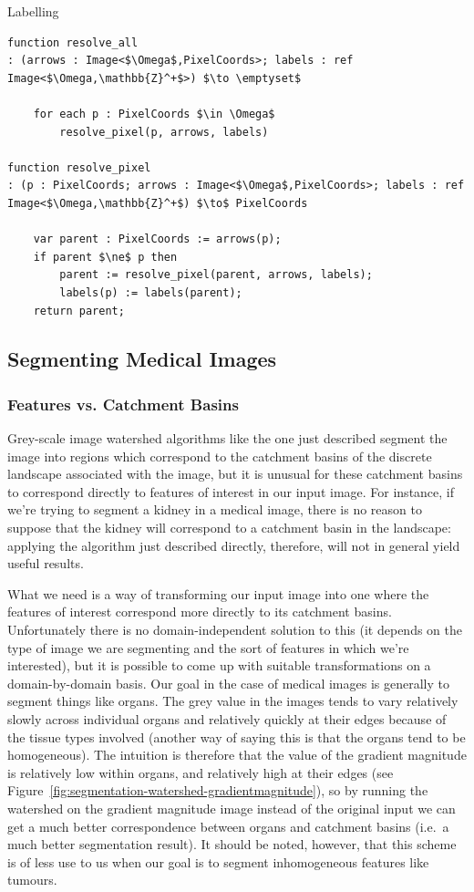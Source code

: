 \begin{stulisting}[p]
\caption{Labelling}
\label{code:segmentation-watershed-labelling}
\begin{lstlisting}[style=Default]
function resolve_all
: (arrows : Image<$\Omega$,PixelCoords>; labels : ref Image<$\Omega,\mathbb{Z}^+$>) $\to \emptyset$

	for each p : PixelCoords $\in \Omega$
		resolve_pixel(p, arrows, labels)

function resolve_pixel
: (p : PixelCoords; arrows : Image<$\Omega$,PixelCoords>; labels : ref Image<$\Omega,\mathbb{Z}^+$) $\to$ PixelCoords

	var parent : PixelCoords := arrows(p);
	if parent $\ne$ p then
		parent := resolve_pixel(parent, arrows, labels);
		labels(p) := labels(parent);
	return parent;
\end{lstlisting}
\end{stulisting}

\subsection{Segmenting Medical Images}

\subsubsection{Features vs. Catchment Basins}

Grey-scale image watershed algorithms like the one just described segment the image into regions which correspond to the catchment basins of the discrete landscape associated with the image, but it is unusual for these catchment basins to correspond directly to features of interest in our input image. For instance, if we're trying to segment a kidney in a medical image, there is no reason to suppose that the kidney will correspond to a catchment basin in the landscape: applying the algorithm just described directly, therefore, will not in general yield useful results.

What we need is a way of transforming our input image into one where the features of interest correspond more directly to its catchment basins. Unfortunately there is no domain-independent solution to this (it depends on the type of image we are segmenting and the sort of features in which we're interested), but it is possible to come up with suitable transformations on a domain-by-domain basis. Our goal in the case of medical images is generally to segment things like organs. The grey value in the images tends to vary relatively slowly across individual organs and relatively quickly at their edges because of the tissue types involved (another way of saying this is that the organs tend to be homogeneous). The intuition is therefore that the value of the gradient magnitude is relatively low within organs, and relatively high at their edges (see Figure~\ref{fig:segmentation-watershed-gradientmagnitude}), so by running the watershed on the gradient magnitude image instead of the original input we can get a much better correspondence between organs and catchment basins (i.e.~a much better segmentation result). It should be noted, however, that this scheme is of less use to us when our goal is to segment inhomogeneous features like tumours.

